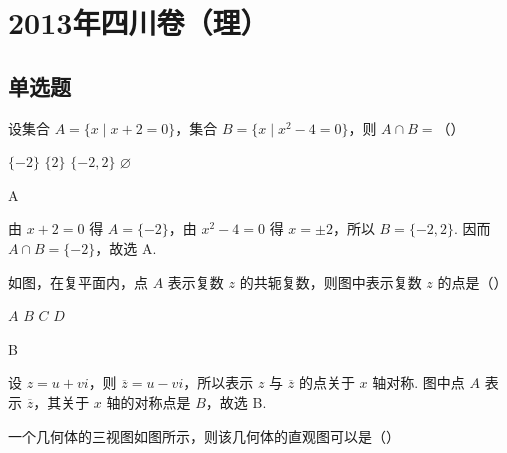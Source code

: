 \chapter{2013年四川卷（理）}

\section{单选题}

\begin{problem}
设集合 \(A = \{x \mid x + 2 = 0\}\)，集合 \(B = \{x \mid x^2 - 4 = 0\}\)，则 \(A \cap B =\)（\quad）

\choices
    {\(\{-2\}\)}
    {\(\{2\}\)}
    {\(\{-2,2\}\)}
    {\(\varnothing\)}
\end{problem}

\begin{answer}
A
\end{answer}

\begin{solution}
由 \(x+2=0\) 得 \(A=\{-2\}\)，由 \(x^2-4=0\) 得 \(x=\pm2\)，所以 \(B=\{-2,2\}\). 因而 \(A\cap B=\{-2\}\)，故选 A.
\end{solution}

\begin{problem}
如图，在复平面内，点 \(A\) 表示复数 \(z\) 的共轭复数，则图中表示复数 \(z\) 的点是（\quad）


\choices
    {\(A\)}
    {\(B\)}
    {\(C\)}
    {\(D\)}
\end{problem}

\begin{answer}
B
\end{answer}

\begin{solution}
设 \(z=u+vi\)，则 \(\overline z=u-vi\)，所以表示 \(z\) 与 \(\overline z\) 的点关于 \(x\) 轴对称. 图中点 \(A\) 表示 \(\overline z\)，其关于 \(x\) 轴的对称点是 \(B\)，故选 B.
\end{solution}

\begin{problem}
一个几何体的三视图如图所示，则该几何体的直观图可以是（\quad）


\choices
    {}
    {}
    {}
    {}
\end{problem}

